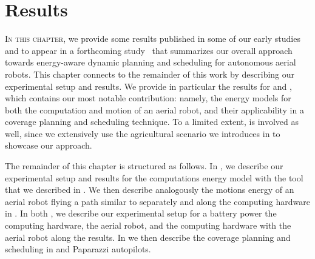 
%
%
%
%
\chapter{Results}
\label{cp:res}


\vspace*{1em}

\lettrine{I}{n this chapter}, we provide some results published in some of our early studies~\citep{seewald2019hlpgpu,seewald2019coarse,seewald2019component,seewald2020mechanical,zamanakos2020energy} and to appear in a forthcoming study~\citep{seewald202Xenergy} that summarizes our overall approach towards energy-aware dynamic planning and scheduling for autonomous aerial robots. This chapter connects to the remainder of this work by describing our experimental setup and results. We provide in particular the results for  and , which contains our most notable contribution: namely, the energy models for both the computation and motion of an aerial robot, and their applicability in a coverage planning and scheduling technique. To a limited extent,  is involved as well, since we extensively use the agricultural scenario we introduces in  to showcase our approach.

The remainder of this chapter is structured as follows. In , we describe our experimental setup and results for the computations energy model with the \powprof{} tool that we described in . We then describe analogously the motions energy of an aerial robot flying a path similar to  separately and along the computing hardware in . In both , we describe our experimental setup for a battery power the computing hardware, the aerial robot, and the computing hardware with the aerial robot along the results. In  we then describe the coverage planning and scheduling in \matlab and Paparazzi autopilots.

